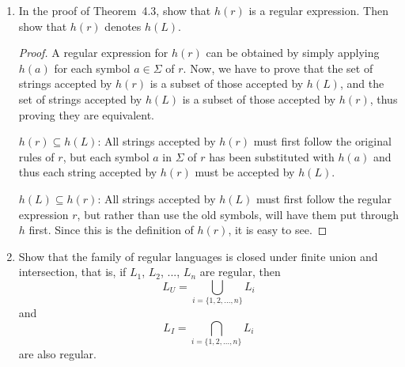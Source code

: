 \documentclass[]{article}
\theoremstyle{definition}
\newenvironment{thm}[1]
  {\renewcommand\theinnercustomtheorem{#1}\innercustomtheorem}
  {\endinnercustomtheorem}
\begin{document}
\begin{enumerate}
\begin{thm}{4.3}
    \begin{proof}
        Let $L$ be a regular language denoted by some regular expression $r$. We find
        $h(r)$ by substituting $h(a)$ for each symbol $a \in \Sigma$ of $r$. It can be shown
        directly by an appeal to the definition of a regular expression that the result is a
        regular expression. It is equally easy to see that the resulting expression denotes
        $h(L)$. All we need to do is to show that for every $w \in L(r)$, the corresponding
        $h(w)$ is in $L(h(r))$ and conversely that for every $v$ in $L(h(r))$ there is a $w$
        in $L$, such that $v = h(w)$. Leaving details as an exercise, we claim that $h(L)$ is
        regular.
    \end{proof}
\end{thm}

\item
    In the proof of Theorem~4.3, show that $h(r)$ is a regular expression. Then show that
    $h(r)$ denotes $h(L)$.

    \begin{proof}
        A regular expression for $h(r)$ can be obtained by simply applying $h(a)$ for
        each symbol $a \in \Sigma$ of $r$. Now, we have to prove that the set of strings
        accepted by $h(r)$ is a subset of those accepted by $h(L)$, and the set of strings
        accepted by $h(L)$ is a subset of those accepted by $h(r)$, thus proving they are
        equivalent.
        
        $h(r) \subseteq h(L)$: All strings accepted by $h(r)$ must first follow the original
        rules of $r$, but each symbol $a$ in $\Sigma$ of $r$ has been substituted with
        $h(a)$ and thus each string accepted by $h(r)$ must be accepted by $h(L)$.
        
        $h(L) \subseteq h(r)$: All strings accepted by $h(L)$ must first follow the regular
        expression $r$, but rather than use the old symbols, will have them put through $h$
        first. Since this is the definition of $h(r)$, it is easy to see.
    \end{proof}
    
\item
    Show that the family of regular languages is closed under finite union and intersection,
    that is, if $L_1$, $L_2$, ..., $L_n$ are regular, then
        $$L_U = \displaystyle\bigcup_{i=\{1, 2, ..., n\}} L_i$$ and
        $$L_I = \displaystyle\bigcap_{i=\{1, 2, ..., n\}} L_i$$ are also regular.
    

\end{enumerate}
\end{document}
